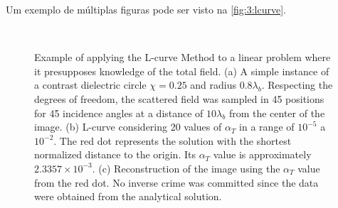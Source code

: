 		Um exemplo de múltiplas figuras pode ser visto na \autoref{fig:3:lcurve}.
		\begin{figure}[!htb]
			\centering
			 \\
			\caption[Exemplo de aplicação do Método da Curva-L.]{Example of applying the L-curve Method to a linear problem where it presupposes knowledge of the total field. (a) A simple instance of a contrast dielectric circle $\chi=0.25$ and radius $0.8\lambda_b$. Respecting the degrees of freedom, the scattered field was sampled in 45 positions for 45 incidence angles at a distance of $10\lambda_b$ from the center of the image. (b) L-curve considering 20 values of $\alpha_T$ in a range of $10^{-5}$ a $10^{-2}$. The red dot represents the solution with the shortest normalized distance to the origin. Its $\alpha_T$ value is approximately $2.3357 \times10^{-3}$. (c) Reconstruction of the image using the $\alpha_T$ value from the red dot. No inverse crime was committed since the data were obtained from the analytical solution.}
			\label{fig:3:lcurve}
		\end{figure}


